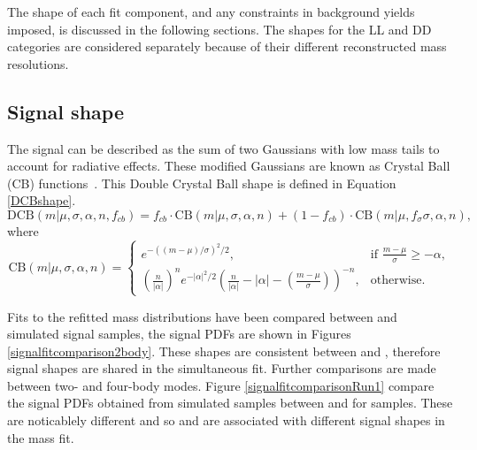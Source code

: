 The shape of each fit component, and any constraints in background yields imposed, is discussed in the following sections. The shapes for the LL and DD \KS categories are considered separately because of their different reconstructed \B mass resolutions.

\subsection{Signal shape}
\label{sec:massfit:signal}

The signal can be described as the sum of two Gaussians with low mass tails to account for radiative effects. These modified Gaussians are known as Crystal Ball (CB) functions~\cite{Skwarnicki:1986xj}. This Double Crystal Ball shape is defined in Equation \ref{DCBshape}. 
\begin{equation}
\mathrm{DCB}(m| \mu,\sigma,\alpha,n,f_{cb}) = f_{cb} \cdot \mathrm{CB}(m| \mu,\sigma,\alpha,n) + (1-f_{cb}) \cdot \mathrm{CB}(m|\mu,f_{\sigma}\sigma,\alpha,n),
\label{DCBshape}
\end{equation}
where
\begin{equation*}
  \mathrm{CB}(m| \mu,\sigma,\alpha,n)=
\begin{cases}
    e^{-((m-\mu)/ \sigma)^2/2},                                   & \text{if } \frac{m-\mu}{\sigma} \geq - \alpha, \\
   \left ( \frac{n}{|\alpha|} \right ) ^n e^{-|\alpha|^2/2} \left ( \frac{n}{|\alpha|} - |\alpha| - \left ( \frac{m-\mu}{\sigma} \right ) \right ) ^{-n} ,    & \text{otherwise.}
\end{cases}
\end{equation*}

Fits to the refitted \B mass distributions have been compared between \runone and \runtwo simulated signal samples, the signal PDFs are shown in Figures \ref{signalfitcomparison2body}. These shapes are consistent between \runone and \runtwo, therefore signal shapes are shared in the simultaneous fit. Further comparisons are made between two- and four-body modes. Figure \ref{signalfitcomparisonRun1} compare the signal PDFs obtained from simulated samples between \kpi and \kpipipi for \runone samples. These are noticablely different and so \kpi and \kpipipi are associated with different signal shapes in the mass fit.


